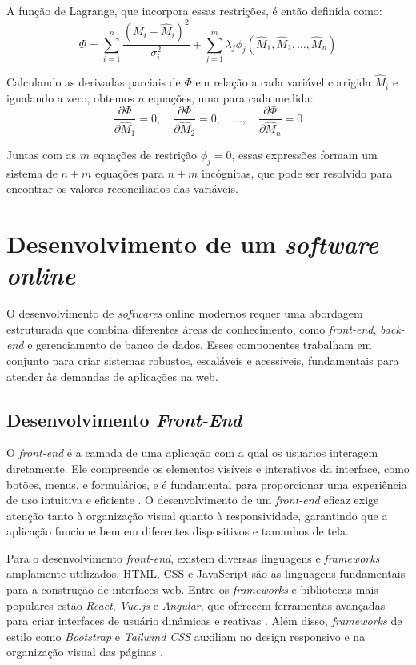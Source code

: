 A função de Lagrange, que incorpora essas restrições, é então definida como:
\begin{equation}
\Phi = \sum_{i=1}^n \frac{(M_i - \hat{M}_i)^2}{\sigma_i^2} + \sum_{j=1}^m \lambda_j \phi_j(\hat{M}_1, \hat{M}_2, \dots, \hat{M}_n)
\end{equation}

Calculando as derivadas parciais de $\Phi$ em relação a cada variável corrigida $\hat{M}_i$ e igualando a zero, obtemos $n$ equações, uma para cada medida:
\begin{equation}
\frac{\partial \Phi}{\partial \hat{M}_1} = 0, \quad \frac{\partial \Phi}{\partial \hat{M}_2} = 0, \quad \dots, \quad \frac{\partial \Phi}{\partial \hat{M}_n} = 0
\end{equation}

Juntas com as $m$ equações de restrição $\phi_j = 0$, essas expressões formam um sistema de $n + m$ equações para $n + m$ incógnitas, que pode ser resolvido para encontrar os valores reconciliados das variáveis.


\section{Desenvolvimento de um \textit{software online}}

O desenvolvimento de \textit{softwares} online modernos requer uma abordagem estruturada que combina diferentes áreas de conhecimento, como \textit{front-end}, \textit{back-end} e gerenciamento de banco de dados. Esses componentes trabalham em conjunto para criar sistemas robustos, escaláveis e acessíveis, fundamentais para atender às demandas de aplicações na web.

\subsection{Desenvolvimento \textit{Front-End}}

O \textit{front-end} é a camada de uma aplicação com a qual os usuários interagem diretamente. Ele compreende os elementos visíveis e interativos da interface, como botões, menus, e formulários, e é fundamental para proporcionar uma experiência de uso intuitiva e eficiente \cite{frontendrole}. O desenvolvimento de um \textit{front-end} eficaz exige atenção tanto à organização visual quanto à responsividade, garantindo que a aplicação funcione bem em diferentes dispositivos e tamanhos de tela.

Para o desenvolvimento \textit{front-end}, existem diversas linguagens e \textit{frameworks} amplamente utilizados. HTML, CSS e JavaScript são as linguagens fundamentais para a construção de interfaces web. Entre os \textit{frameworks} e bibliotecas mais populares estão \textit{React}, \textit{Vue.js} e \textit{Angular}, que oferecem ferramentas avançadas para criar interfaces de usuário dinâmicas e reativas \cite{reactbook}. Além disso, \textit{frameworks} de estilo como \textit{Bootstrap} e \textit{Tailwind CSS} auxiliam no design responsivo e na organização visual das páginas \cite{bootstrapdoc}.

